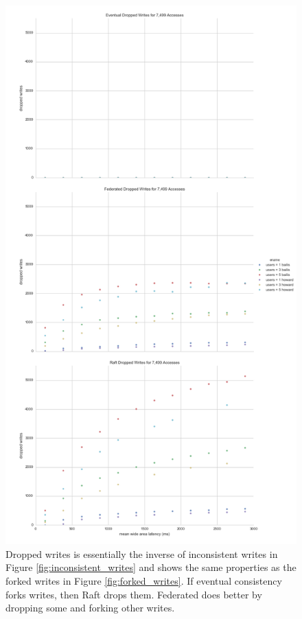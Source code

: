 \documentclass[10pt,letterpaper]{article}
\begin{document}
\begin{figure}[!h]
    \centering
        \includegraphics[height=0.9\textheight]{figures/dropped_writes.png}
        \caption{\textsf{Dropped writes is essentially the inverse of inconsistent writes in Figure \ref{fig:inconsistent_writes} and shows the same properties as the forked writes in Figure \ref{fig:forked_writes}. If eventual consistency forks writes, then Raft drops them. Federated does better by dropping some and forking other writes.}}
        \label{fig:dropped_writes}
\end{figure}
\end{document}

